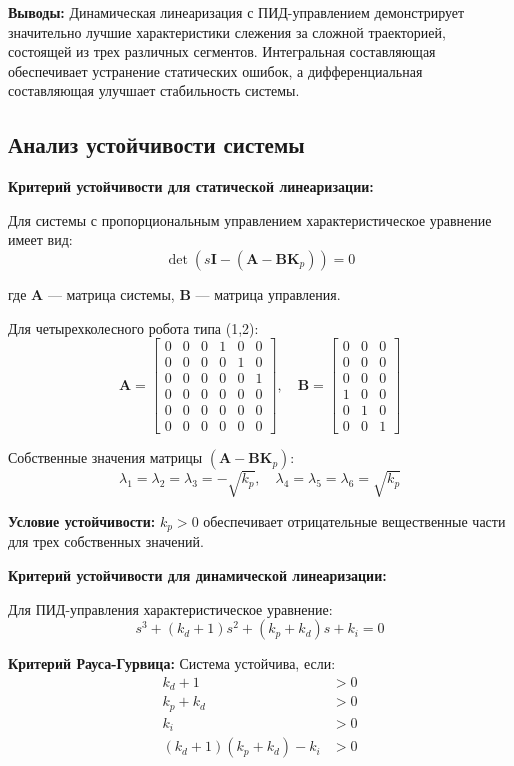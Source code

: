 \textbf{Выводы:}
Динамическая линеаризация с ПИД-управлением демонстрирует значительно лучшие характеристики слежения за сложной траекторией, состоящей из трех различных сегментов. Интегральная составляющая обеспечивает устранение статических ошибок, а дифференциальная составляющая улучшает стабильность системы.

\subsection{Анализ устойчивости системы}

\textbf{Критерий устойчивости для статической линеаризации:}

Для системы с пропорциональным управлением характеристическое уравнение имеет вид:
$$\det(s\mathbf{I} - (\mathbf{A} - \mathbf{B}\mathbf{K}_p)) = 0$$

где $\mathbf{A}$ --- матрица системы, $\mathbf{B}$ --- матрица управления.

Для четырехколесного робота типа (1,2):
$$\mathbf{A} = \begin{bmatrix}
0 & 0 & 0 & 1 & 0 & 0 \\
0 & 0 & 0 & 0 & 1 & 0 \\
0 & 0 & 0 & 0 & 0 & 1 \\
0 & 0 & 0 & 0 & 0 & 0 \\
0 & 0 & 0 & 0 & 0 & 0 \\
0 & 0 & 0 & 0 & 0 & 0
\end{bmatrix}, \quad \mathbf{B} = \begin{bmatrix}
0 & 0 & 0 \\
0 & 0 & 0 \\
0 & 0 & 0 \\
1 & 0 & 0 \\
0 & 1 & 0 \\
0 & 0 & 1
\end{bmatrix}$$

Собственные значения матрицы $(\mathbf{A} - \mathbf{B}\mathbf{K}_p)$:
$$\lambda_1 = \lambda_2 = \lambda_3 = -\sqrt{k_p}, \quad \lambda_4 = \lambda_5 = \lambda_6 = \sqrt{k_p}$$

\textbf{Условие устойчивости:} $k_p > 0$ обеспечивает отрицательные вещественные части для трех собственных значений.

\textbf{Критерий устойчивости для динамической линеаризации:}

Для ПИД-управления характеристическое уравнение:
$$s^3 + (k_d + 1)s^2 + (k_p + k_d)s + k_i = 0$$

\textbf{Критерий Рауса-Гурвица:} Система устойчива, если:
\begin{align}
k_d + 1 &> 0 \\
k_p + k_d &> 0 \\
k_i &> 0 \\
(k_d + 1)(k_p + k_d) - k_i &> 0
\end{align}

